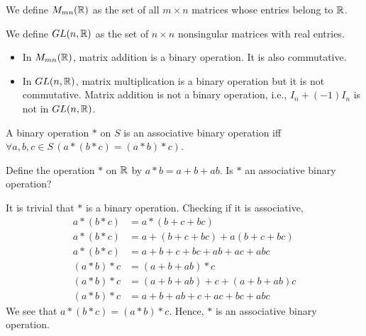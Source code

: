     \begin{dfn}
        We define \(M_{mn}(\mathbb{R})\) as the set of all \(m \times n\) matrices whose entries belong to \(\mathbb{R}\).
    \end{dfn}

    \begin{dfn}
        We define \(GL(n, \mathbb{R})\) as the set of \(n \times n\) nonsingular matrices with real entries.
    \end{dfn}

    \begin{example}
        \mbox{}

        \begin{itemize}
            \item In \(M_{mn}(\mathbb{R})\), matrix addition is a binary operation. It is also commutative.

            \item In \(GL(n, \mathbb{R})\), matrix multiplication is a binary operation but it is not commutative. Matrix addition is not a binary operation, i.e., \(I_n + (-1)I_n\) is not in \(GL(n, \mathbb{R})\).
        \end{itemize}
    \end{example}

    \begin{dfn}
        A binary operation \(*\) on \(S\) is an associative binary operation iff \(\forall a,b,c\!\in\! S\, (a * (b * c) = (a * b) * c)\).
    \end{dfn}

    \begin{example}
        Define the operation \(*\) on \(\mathbb{R}\) by \(a * b = a + b + ab\). Is \(*\) an associative binary operation?

        It is trivial that \(*\) is a binary operation. Checking if it is associative,
        \begin{align*}
            a * (b * c) &= a * (b + c + bc) \\
            a * (b * c) &= a + (b + c + bc) + a(b + c + bc)  \\
            a * (b * c) &= a + b + c + bc + ab + ac + abc  \\
            (a * b) * c &= (a + b + ab) * c \\
            (a * b) * c &= (a + b + ab) + c + (a + b + ab)c \\
            (a * b) * c &= a + b + ab + c + ac + bc + abc
        \end{align*}
        We see that \(a * (b * c) = (a * b) * c\). Hence, \(*\) is an associative binary operation.
    \end{example}

